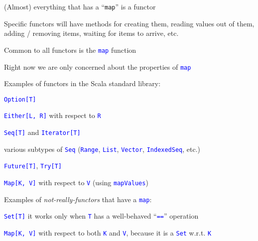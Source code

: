 (Almost) everything that has a ``\texttt{map}'' is a functor

Specific functors will have methods for creating them, reading values
out of them, adding / removing items, waiting for items to arrive,
etc.

Common to all functors is the \texttt{\textcolor{blue}{\footnotesize{}map}}
function

Right now we are only concerned about the properties of \texttt{\textcolor{blue}{\footnotesize{}map}}{\footnotesize\par}

Examples of functors in the Scala standard library:

\texttt{\textcolor{blue}{\footnotesize{}Option{[}T{]}}}{\footnotesize\par}

\texttt{\textcolor{blue}{\footnotesize{}Either{[}L, R{]}}} with respect
to \texttt{\textcolor{blue}{\footnotesize{}R}}{\footnotesize\par}

\texttt{\textcolor{blue}{\footnotesize{}Seq{[}T{]}}} and \texttt{\textcolor{blue}{\footnotesize{}Iterator{[}T{]} }}{\footnotesize\par}

various subtypes of \texttt{\textcolor{blue}{\footnotesize{}Seq}}
(\texttt{\textcolor{blue}{\footnotesize{}Range}}, \texttt{\textcolor{blue}{\footnotesize{}List}},
\texttt{\textcolor{blue}{\footnotesize{}Vector}}, \texttt{\textcolor{blue}{\footnotesize{}IndexedSeq}},
etc.)

\texttt{\textcolor{blue}{\footnotesize{}Future{[}T{]}}}, \texttt{\textcolor{blue}{\footnotesize{}Try{[}T{]}}}{\footnotesize\par}

\texttt{\textcolor{blue}{\footnotesize{}Map{[}K, V{]}}} with respect
to \texttt{\textcolor{blue}{\footnotesize{}V}} (using \texttt{\textcolor{blue}{\footnotesize{}mapValues}})

Examples of \emph{not-really-functors} that have a \texttt{\textcolor{blue}{\footnotesize{}map}}:

\texttt{\textcolor{blue}{\footnotesize{}Set{[}T{]}}} \textendash{}
it works only when \texttt{\textcolor{blue}{\footnotesize{}T}} has
a well-behaved ``\texttt{\textcolor{blue}{\footnotesize{}==}}''
operation

\texttt{\textcolor{blue}{\footnotesize{}Map{[}K, V{]}}} with respect
to both \texttt{\textcolor{blue}{\footnotesize{}K}} and \texttt{\textcolor{blue}{\footnotesize{}V}},
because it is a \texttt{\textcolor{blue}{\footnotesize{}Set}} w.r.t.
\texttt{\textcolor{blue}{\footnotesize{}K}}{\footnotesize\par}

